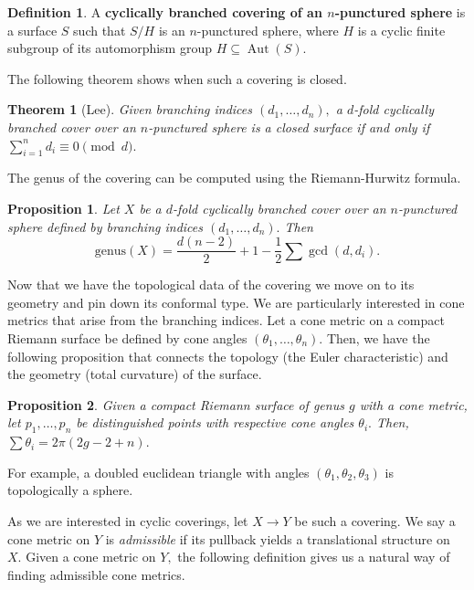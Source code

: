 \documentclass[12pt,reqno]{amsart}
\DeclareMathOperator{\Aut}{Aut}
\newtheorem*{thm*}{Theorem}
\newtheorem*{proposition}{Proposition}
\theoremstyle{definition}
\newtheorem{defn}{Definition}
\theoremstyle{remark}
\begin{document}

\begin{defn} A \textbf{cyclically branched covering of an $n$-punctured sphere} is a surface $S$ such that $S/H$ is an $n$-punctured sphere, where $H$ is a cyclic finite subgroup of its automorphism group $H \subseteq \Aut(S)$.   \end{defn}



The following theorem shows when such a covering is closed. 

\begin{thm*} [Lee] Given branching indices $(d_1, \ldots , d_n),$ a $d$-fold cyclically branched cover over an $n$-punctured sphere is a closed surface if and only if $\sum\limits_{i=1}^n d_i \equiv 0 \pmod d.$ 
\end{thm*}

The genus of the covering can be computed using the Riemann-Hurwitz formula.

\begin{proposition}
Let $X$ be a $d$-fold cyclically branched cover over an $n$-punctured sphere defined by branching indices $(d_1, \ldots , d_n).$ Then $$\textrm{genus}(X) = \frac{d (n - 2)}{2} + 1 - \frac{1}{2} \sum \gcd(d, d_i).$$ 
\end{proposition}

Now that we have the topological data of the covering we move on to its geometry and pin down its conformal type. We are particularly interested in cone metrics that arise from the branching indices. Let a cone metric on a compact Riemann surface be defined by cone angles $(\theta_1, \ldots , \theta_n).$ Then, we have the following proposition that connects the topology (the Euler characteristic) and the geometry (total curvature) of the surface. 

\begin{proposition}
Given a compact Riemann surface of genus $g$ with a cone metric, let $p_1, \ldots , p_n$ be distinguished points with respective cone angles $\theta_i.$ Then, $\sum \theta_i = 2 \pi (2 g - 2 + n).$
\end{proposition}

For example, a doubled euclidean triangle with angles $(\theta_1, \theta_2, \theta_3)$ is topologically a sphere. 

As we are interested in cyclic coverings, let $X \rightarrow Y$ be such a covering. We say a cone metric on $Y$ is \textit{admissible} if its pullback yields a translational structure on $X.$ Given a cone metric on $Y,$ the following definition gives us a natural way of finding admissible cone metrics. 
\end{document}
